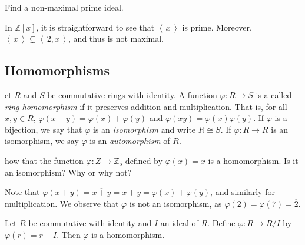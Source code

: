 \documentclass[english,course]{lecture}
\newcommand{\ideal}[1]{\left\langle\, #1 \,\right\rangle}
\def\p{\varphi}
\newenvironment{solution}[1][Solution]{\begin{trivlist}\pushQED{\qed}\item[\hskip \labelsep  \bfseries #1{}.\hspace{10pt}]}{\popQED\end{trivlist}}\renewcommand{\qedsymbol}{$\checkmark$}{\newenvironment{answer}{\renewcommand\qedsymbol{$\blacklozenge$}\begin{proof}[Answer]}{\end{proof}}}\newenvironment{answer}[1][Answer]{\begin{trivlist}\pushQED{\qed}\item[\hskip \labelsep  \bfseries #1{}.\hspace{10pt}]}{\popQED\end{trivlist}}\renewcommand{\qedsymbol}{$\lozenge$}
\theoremstyle{plain}
\newenvironment{exercise}[1]
  {\renewcommand\theinnerexercise{#1}\innerexercise}
  {\endinnerexercise}
\newenvironment{definition}[1]
  {\renewcommand\theinnerdefinition{#1}\innerdefinition}
  {\endinnerdefinition}
\def\Z{{\mathbb Z}}
\def\presnotes{}
\begin{document}

\begin{challenge}
	Find a non-maximal prime ideal.
\end{challenge}



\begin{solution}
	In $\Z[x]$, it is straightforward to see that $\ideal{x}$ is prime. Moreover, $\ideal{x}\subsetneq \ideal{2,x}$, and thus is not maximal.
\end{solution}


\subsection{Homomorphisms}\label{SubSec-Homomorphisms}

\begin{definition}
	Let $R$ and $S$ be commutative rings with identity.
	A function $\p : R\to S$ is a called \emph{ring homomorphism} if it preserves addition and multiplication.
	That is, for all $x,y\in R$, $\p(x+y) = \p(x) + \p(y)$ and $\p(xy) = \p(x)\p(y)$.
	If $\p$ is a bijection, we say that $\p$ is an \emph{isomorphism} and write $R\cong S$.
	If $\p : R\to R$ is an isomorphism, we say $\p$ is an \emph{automorphism} of $R$.
\end{definition}


\begin{exercise}
	Show that the function $\p : Z\to \Z_{5}$ defined by $\p(x) = \overline{x}$ is a homomorphism.
	Is it an isomorphism? Why or why not?
\end{exercise}

\begin{solution}
	Note that $\p(x+y) = \overline{x+y} = \overline{x} + \overline{y} = \p(x) + \p(y)$, and similarly for multiplication.
	We observe that $\p$ is not an isomorphism, as $\p(2) = \p(7) = \overline{2}$.
\end{solution}


\begin{theorem}
	Let $R$ be commutative with identity and $I$ an ideal of $R$. Define $\p: R\to R/I$ by $\p(r) = r+I$. Then $\p$ is a homomorphism.
\end{theorem}

\begin{solution}

\end{solution}
\end{document}
